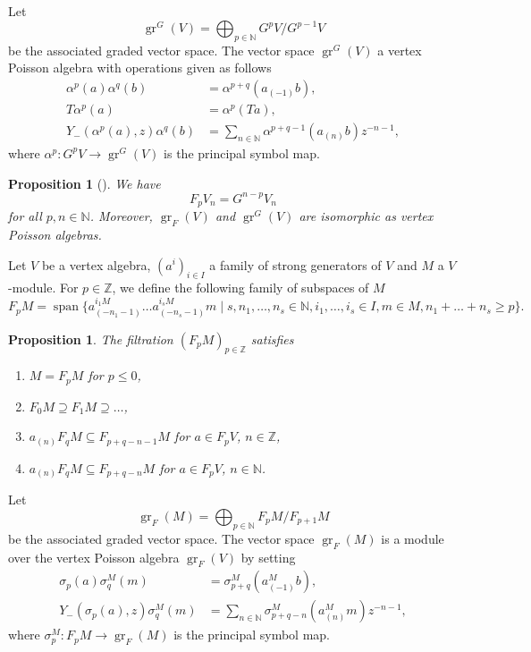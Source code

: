 \documentclass[12pt, a4paper]{article}
\newtheorem{proposition}[theorem]{Proposition}
\theoremstyle{remark}
\DeclareMathOperator{\gr}{gr}
\DeclareMathOperator{\vspan}{span}
\begin{document}
Let
\begin{equation*}
  \gr^G(V)=\bigoplus_{p\in\mathbb{N}}G^pV/G^{p-1}V
\end{equation*}
be the associated graded vector space.
The vector space $\gr^G(V)$ a vertex Poisson algebra with operations given as follows
\begin{align*}
  \alpha^p(a)\alpha^q(b) &= \alpha^{p + q}(a_{(-1)}b), \\
  T\alpha^p(a) &= \alpha^p(Ta), \\
  Y_-(\alpha^p(a), z)\alpha^q(b) &= \sum_{n \in \mathbb{N}}\alpha^{p + q - 1}(a_{(n)}b)z^{-n - 1},
\end{align*}
where $\alpha^p: G^pV \to \gr^G(V)$ is the principal symbol map.

\begin{proposition}[{\cite[Proposition 2.6.1]{arakawa_remark_2012}}]
  \label{prp:3}
  We have
  \begin{equation*}
    F_pV_n = G^{n - p}V_n
  \end{equation*}
  for all $p, n \in \mathbb{N}$.
  Moreover, $\gr_F(V)$ and $\gr^G(V)$ are isomorphic as vertex Poisson algebras.
\end{proposition}

Let $V$ be a vertex algebra, $(a^i)_{i \in I}$ a family of strong generators of $V$ and $M$ a $V$-module.
For $p\in \mathbb{Z}$, we define the following family of subspaces of $M$
\begin{equation*}
  F_pM = \vspan \{a^{i_1M}_{(-n_1 - 1)}\dots a^{i_sM}_{(-n_s - 1)}m \mid s, n_1, \dots, n_s \in \mathbb{N}, i_1, \dots, i_s \in I, m \in M, n_1 + \dots + n_s \ge p\}.
\end{equation*}

\begin{proposition}
  \label{prp:4}
  The filtration $(F_pM)_{p \in \mathbb{Z}}$ satisfies
  \begin{enumerate}[label={(\alph*)}]
  \item $M = F_pM$ for $p \le 0$,
  \item $F_0M \supseteq F_1M \supseteq \dots$,
  \item $a_{(n)}F_qM \subseteq F_{p + q - n - 1}M$ for $a \in F_pV$, $n \in \mathbb{Z}$,
  \item $a_{(n)}F_qM \subseteq F_{p + q - n}M$ for $a \in F_pV$, $n \in \mathbb{N}$.
  \end{enumerate}
\end{proposition}

Let
\begin{equation*}
  \gr_F(M) = \bigoplus_{p\in \mathbb{N}}F_pM/F_{p + 1}M
\end{equation*}
be the associated graded vector space.
The vector space $\gr_F(M)$ is a module over the vertex Poisson algebra $\gr_F(V)$ by setting
\begin{align*}
  \sigma_p(a)\sigma^M_q(m) &= \sigma^M_{p + q}(a^M_{(-1)}b), \\
  Y_-(\sigma_p(a), z)\sigma^M_q(m) &= \sum_{n \in \mathbb{N}}\sigma^M_{p + q - n}(a^M_{(n)}m)z^{-n - 1},
\end{align*}
where $\sigma^M_p: F_pM \to \gr_F(M)$ is the principal symbol map.
\end{document}
